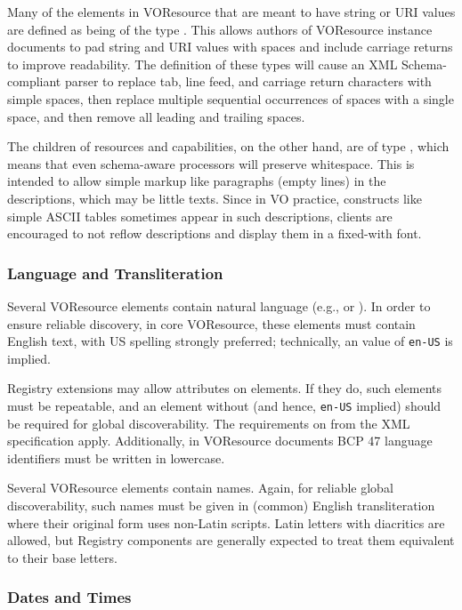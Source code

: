 \documentclass[11pt,a4paper]{ivoa}
\begin{document}
Many of the elements in VOResource that are meant to have string or
URI values are defined as being of the type .
This allows authors of VOResource instance documents to pad string and
URI values with spaces and include carriage returns to improve
readability.  The definition of these types will cause an XML
Schema-compliant parser to replace tab, line feed, and carriage return
characters with simple spaces, then replace multiple sequential
occurrences of spaces with a single space, and then remove all leading
and trailing spaces.

The  children of resources and capabilities, on the
other hand, are of type , which means that even
schema-aware processors will preserve whitespace.  This is intended to
allow simple markup like paragraphs (empty lines) in the descriptions,
which may be little texts.  Since in VO practice, constructs like simple
ASCII tables sometimes appear in such descriptions, clients are
encouraged to not reflow descriptions and display them in a fixed-with
font.

\subsubsection{Language and Transliteration}

Several VOResource elements contain natural language (e.g.,
 or ).  In order to
ensure reliable discovery, in core VOResource, these elements must
contain English text, with US spelling strongly preferred; technically,
an  value of \texttt{en-US} is implied.

Registry extensions may allow  attributes on elements.
If they do, such elements must be repeatable, and an element without
 (and hence, \texttt{en-US} implied) should be required
for global discoverability.  The requirements on  from
the XML specification \citep{std:XML} apply.  Additionally, in
VOResource documents BCP 47 language identifiers must be written in
lowercase.

Several VOResource elements contain names.  Again, for reliable global
discoverability, such names must be given in (common) English
transliteration where their original form uses non-Latin scripts.
Latin letters with diacritics are allowed, but Registry components are
generally expected to treat them equivalent to their base letters.

\subsubsection{Dates and Times}
\end{document}

